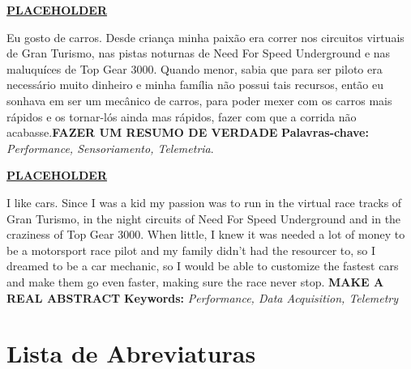 
\textbf{\underline{PLACEHOLDER}}


\noindent Eu gosto de carros. Desde criança minha paixão era correr nos circuitos virtuais de Gran Turismo, nas pistas noturnas de Need For Speed Underground e nas maluquíces de Top Gear 3000. Quando menor, sabia que para ser piloto era necessário muito dinheiro e minha família não possui tais recursos, então eu sonhava em ser um mecânico de carros, para poder mexer com os carros mais rápidos e os tornar-lós ainda mas rápidos, fazer com que a corrida não acabasse.\textbf{FAZER UM RESUMO DE VERDADE} 
\textbf{Palavras-chave:} \textit{Performance, Sensoriamento, Telemetria}.

 
\textbf{\underline{PLACEHOLDER}}


\noindent I like cars. Since I was a kid my passion was to run in the virtual race tracks of Gran Turismo, in the night circuits of Need For Speed Underground and in the craziness of Top Gear 3000. When little, I knew it was needed a lot of money to be a motorsport race pilot and my family didn't had the resourcer to, so I dreamed to be a car mechanic, so I would be able to customize the fastest cars and make them go even faster, making sure the race never stop. \textbf{MAKE A REAL ABSTRACT}     
\noindent \textbf{Keywords:} \textit{Performance, Data Acquisition, Telemetry} 

\tableofcontents
\listoffigures
\listoftables
\newpage
\chapter*{Lista de Abreviaturas\hfill} 
\listofsymbols

\newpage
\pagestyle{myheadings}
